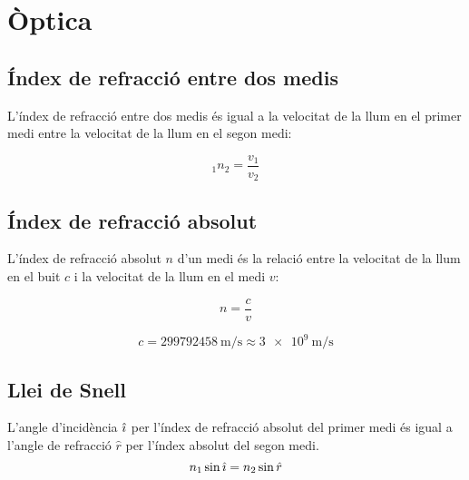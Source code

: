 \section{Òptica}
\label{sec:optica}

\subsection{Índex de refracció entre dos medis}
\label{sub:index_de_refraccio_entre_dos_medis}

L'índex de refracció entre dos medis és igual a la velocitat de la llum en el
primer medi entre la velocitat de la llum en el segon medi:

\begin{equation}
    _1n_2 = \frac{v_1}{v_2}
\end{equation}

\subsection{Índex de refracció absolut}
\label{sub:index_de_refraccio_absolut}

L'índex de refracció absolut $n$ d'un medi és la relació entre la velocitat de
la llum en el buit $c$ i la velocitat de la llum en el medi $v$:

\begin{equation}
    n = \frac{c}{v}
\end{equation}

\begin{equation}
    c = \SI{299792458}{\metre \per \second} \approx \SI{3e9}{\metre\per\second}
\end{equation}

\subsection{Llei de Snell}
L'angle d'incidència $\hat{\imath}$ per l'índex de refracció absolut del primer medi
és igual a l'angle de refracció $\hat{r}$ per l'índex absolut del segon medi.
\begin{equation}
    n_1 \sin \hat{\imath} = n_2 \sin \hat{r}
\end{equation}

